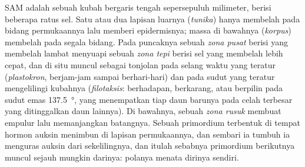 \begin{proposition}\label{prop:b2:plant-meristems:sam}
SAM adalah sebuah kubah bergaris tengah sepersepuluh milimeter, berisi
beberapa ratus sel. Satu atau dua lapisan luarnya (\emph{tunika}) hanya
membelah pada bidang permukaannya lalu memberi epidermisnya; massa di
bawahnya (\emph{korpus}) membelah pada segala bidang. Pada puncaknya
sebuah \emph{zona pusat} berisi  yang membelah lambat menyuapi
sebuah \emph{zona tepi} berisi sel yang membelah lebih cepat, dan di
situ \emph{} muncul sebagai tonjolan pada selang waktu
yang teratur (\emph{plastokron}, berjam-jam sampai berhari-hari) dan
pada sudut yang teratur mengelilingi kubahnya (\emph{filotaksis}:
berhadapan, berkarang, atau berpilin pada sudut emas
\qty{137.5}{\degree}, yang menempatkan tiap daun barunya pada celah
terbesar yang ditinggalkan daun lainnya). Di bawahnya, sebuah
\emph{zona rusuk} membuat empulur lalu memanjangkan batangnya. Sebuah
primordium terbentuk di tempat hormon auksin menimbun di lapisan
permukaannya, dan sembari ia tumbuh ia menguras auksin dari
sekelilingnya, dan itulah sebabnya primordium berikutnya muncul sejauh
mungkin darinya: polanya menata dirinya sendiri.
\end{proposition}

